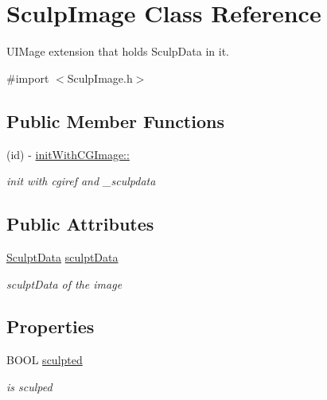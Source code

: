 \hypertarget{interface_sculp_image}{
\section{\-Sculp\-Image \-Class \-Reference}
\label{interface_sculp_image}
}


\-U\-I\-Mage extension that holds \-Sculp\-Data in it.  




{\ttfamily \#import $<$\-Sculp\-Image.\-h$>$}

\subsection*{\-Public \-Member \-Functions}
\begin{DoxyCompactItemize}
\item 
(id) -\/ \hyperlink{interface_sculp_image_af042bf65d947f9797abfcf5ba93d4d15}{init\-With\-C\-G\-Image\-::}
\begin{DoxyCompactList}\small\item\em init with cgiref and \-\_\-sculpdata \end{DoxyCompactList}\end{DoxyCompactItemize}
\subsection*{\-Public \-Attributes}
\begin{DoxyCompactItemize}
\item 
\hyperlink{struct_sculpt_data}{\-Sculpt\-Data} \hyperlink{interface_sculp_image_aaa7634b10052c4de32a643ad171b3e5d}{sculpt\-Data}
\begin{DoxyCompactList}\small\item\em sculpt\-Data of the image \end{DoxyCompactList}\end{DoxyCompactItemize}
\subsection*{\-Properties}
\begin{DoxyCompactItemize}
\item 
\hypertarget{interface_sculp_image_a5e7b406c69bacf7adb88a73d13b532b9}{
\-B\-O\-O\-L \hyperlink{interface_sculp_image_a5e7b406c69bacf7adb88a73d13b532b9}{sculpted}}
\label{interface_sculp_image_a5e7b406c69bacf7adb88a73d13b532b9}

\begin{DoxyCompactList}\small\item\em is sculped \end{DoxyCompactList}\end{DoxyCompactItemize}


